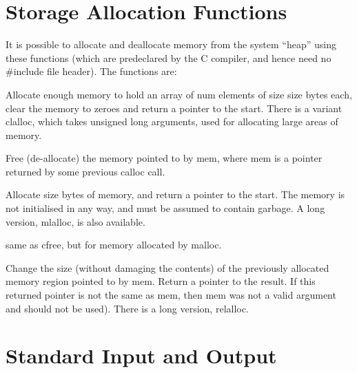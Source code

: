 \section{Storage Allocation Functions}
     It is  possible to  allocate and deallocate memory from the
system ``heap'' using these functions (which are predeclared by the C
compiler, and hence need no {\cd \#include} file header). The
functions are:
\begin{hanglist}
 Allocate enough memory to hold an array of {\cd num} elements
of size {\cd size} bytes each, clear the memory to zeroes and
return a pointer to the start. There is a variant {\cd clalloc},
which takes {\cd unsigned long} arguments, used for allocating large
areas of memory.

 Free (de-allocate) the memory pointed to by {\cd mem}, where
{\cd mem} is a pointer returned by some previous {\cd calloc} call.

 Allocate {\cd size} bytes of memory, and return a pointer to the
start. The memory is not initialised in any way, and must be
assumed to contain garbage. A {\cd long} version, {\cd mlalloc}, is
also available.

 same as {\cd cfree}, but for memory allocated by {\cd malloc}.

 Change the size (without damaging the contents) of the previously
allocated memory region pointed to by {\cd mem}.  Return a pointer to
the result.  If this returned pointer is not the same as {\cd mem},
then {\cd mem} was not a valid argument and should not be used).
There is a {\cd long} version, {\cd relalloc}.

\end{hanglist}

\section{Standard Input and Output}

